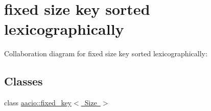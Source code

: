 \hypertarget{group__fixed__key}{}\section{fixed size key sorted lexicographically}
\label{group__fixed__key}
Collaboration diagram for fixed size key sorted lexicographically\+:
\subsection*{Classes}
\begin{DoxyCompactItemize}
\item 
class \mbox{\hyperlink{classaacio_1_1fixed__key}{aacio\+::fixed\+\_\+key$<$ Size $>$}}
\end{DoxyCompactItemize}
